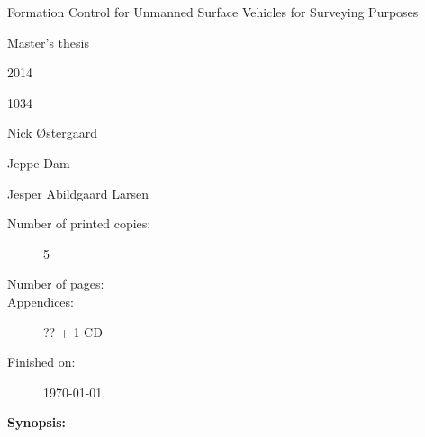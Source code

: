 \begin{minipage}[c]{0.45\textwidth}
	\begin{description}[leftmargin=\parindent+0.5em,labelindent=\parindent]
	\item [\textbf{Title:}] \tightlist
	\item Formation Control for Unmanned Surface Vehicles for Surveying Purposes
	\end{description}

	\begin{description}
	\item [\textbf{Theme:}] \tightlist
	\item Master’s thesis
	\end{description}

	\begin{description}
	\item[Projectperiod:] \tightlist
	\item 2014
	\end{description}
	\begin{description}
	\item[Projectgroup:] \tightlist
	\item 1034
	\end{description}

	\begin{description}
	\item[Participants:] \tightlist
	\item Nick \O stergaard 
	\item Jeppe Dam
	\end{description} 

	\begin{description}
	\item[Supervisor:] \tightlist
	\item Jesper Abildgaard Larsen
	\end{description}

	\begin{description}
	\item[Number of printed copies:] 5
	\item[Number of pages:] \arabic{lastsheet} 
	\item[Appendices:] ?? + 1 CD
	\item[Finished on:] \today
	\end{description}


\end{minipage}
\hfill
\begin{minipage}[r]{0.50\textwidth}


  \hfill

  {\textbf{Synopsis:}}\bigskip \\
  \fbox{
    \parbox[c]{\textwidth-0.5em}{
\bigskip
     {\vfill{\small 
     \bigskip}}
     }}

\end{minipage}



